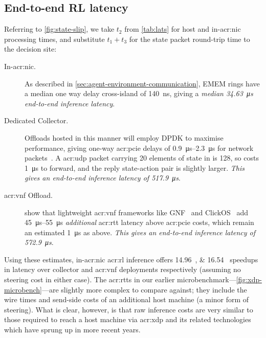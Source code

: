 \subsection{End-to-end RL latency}
Referring to \cref{fig:state-slip}, we take $t_2$ from \cref{tab:lats} for host and in-\gls{acr:nic} processing times, and substitute $t_1+t_3$ for the state packet round-trip time to the decision site:
\begin{description}
	\item[In-\gls{acr:nic}.] As described in \cref{sec:agent-environment-communication}, EMEM rings have a median one way delay cross-island of \qty{140}{\nano\second}, giving a \emph{median \qty{34.63}{\micro\second} end-to-end inference latency}.
	\item[Dedicated Collector.] Offloads hosted in this manner will employ DPDK to maximise performance, giving one-way \gls{acr:pcie} delays of \qtyrange{0.9}{2.3}{\micro\second} for network packets~\parencite{DBLP:conf/sigcomm/NeugebauerAZAL018}.
	A \gls{acr:udp} packet carrying \num{20} elements of state in \approachshort{} is \qty{128}{\byte}, so costs \qty{1}{\micro\second} to forward, and the reply state-action pair is slightly larger.
	\emph{This gives an end-to-end inference latency of \qty{517.9}{\micro\second}}.
	\item[\gls{acr:vnf} Offload.] \Textcite{DBLP:journals/cm/CzivaP17} show that  lightweight \gls{acr:vnf} frameworks like GNF~\parencite{DBLP:journals/cm/CzivaP17} and ClickOS~\parencite{DBLP:conf/nsdi/MartinsAROHBH14} add \qtyrange{45}{55}{\micro\second} \emph{additional} \gls{acr:rtt} latency above \gls{acr:pcie} costs, which remain an estimated \qty{1}{\micro\second} as above.
	\emph{This gives an end-to-end inference latency of \qty{572.9}{\micro\second}}.
\end{description}
Using these estimates, in-\gls{acr:nic} \gls{acr:rl} inference offers \qtylist{14.96;16.54}{\times} speedups in latency over collector and \gls{acr:vnf} deployments respectively (assuming no steering cost in either case).
The \glspl{acr:rtt} in our earlier microbenchmark---\cref{fig:xdp-microbench}---are slightly more complex to compare against; they include the wire times and send-side costs of an additional host machine (a minor form of steering).
What is clear, however, is that raw \approachshort{} inference costs are very similar to those required to reach a host machine via \gls{acr:xdp} and its related technologies which have sprung up in more recent years.

